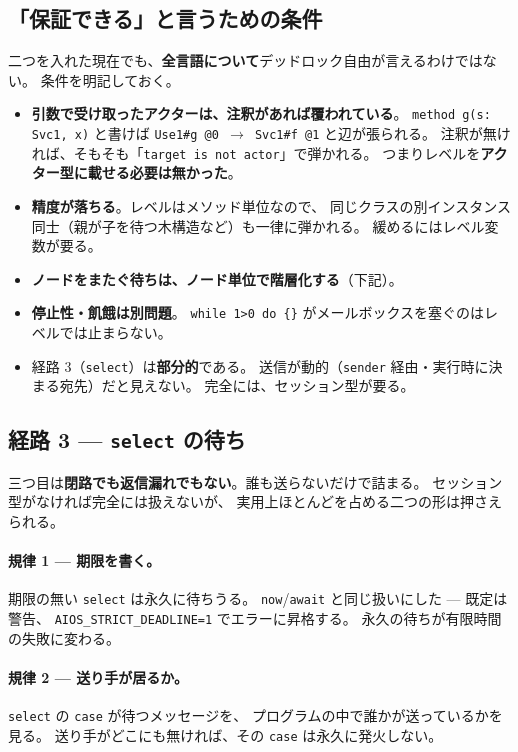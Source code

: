 \documentclass[11pt,a4paper]{ltjsarticle}
\theoremstyle{definition}
\theoremstyle{remark}
\begin{document}
\subsection{「保証できる」と言うための条件}

二つを入れた現在でも、\textbf{全言語について}デッドロック自由が言えるわけではない。
条件を明記しておく。

\begin{itemize}
\item \textbf{引数で受け取ったアクターは、注釈があれば覆われている}。
      \texttt{method g(s: Svc1, x)} と書けば
      \texttt{Use1\#g @0 $\to$ Svc1\#f @1} と辺が張られる。
      注釈が無ければ、そもそも「\texttt{target is not actor}」で弾かれる。
      つまりレベルを\textbf{アクター型に載せる必要は無かった}。
\item \textbf{精度が落ちる}。レベルはメソッド単位なので、
      同じクラスの別インスタンス同士（親が子を待つ木構造など）も一律に弾かれる。
      緩めるにはレベル変数が要る。
\item \textbf{ノードをまたぐ待ちは、ノード単位で階層化する}（下記）。
\item \textbf{停止性・飢餓は別問題}。
      \texttt{while 1>0 do \{\}} がメールボックスを塞ぐのはレベルでは止まらない。
\item 経路 3（\texttt{select}）は\textbf{部分的}である。
      送信が動的（\texttt{sender} 経由・実行時に決まる宛先）だと見えない。
      完全には、セッション型が要る。
\end{itemize}

\subsection{経路 3 --- \texttt{select} の待ち}
\label{sec:select3}

三つ目は\textbf{閉路でも返信漏れでもない}。誰も送らないだけで詰まる。
セッション型がなければ完全には扱えないが、
実用上ほとんどを占める二つの形は押さえられる。

\paragraph{規律 1 --- 期限を書く。}
期限の無い \texttt{select} は永久に待ちうる。
\texttt{now}/\texttt{await} と同じ扱いにした --- 既定は警告、
\texttt{AIOS\_STRICT\_DEADLINE=1} でエラーに昇格する。
永久の待ちが有限時間の失敗に変わる。

\paragraph{規律 2 --- 送り手が居るか。}
\texttt{select} の \texttt{case} が待つメッセージを、
プログラムの中で誰かが送っているかを見る。
送り手がどこにも無ければ、その \texttt{case} は永久に発火しない。
\end{document}
